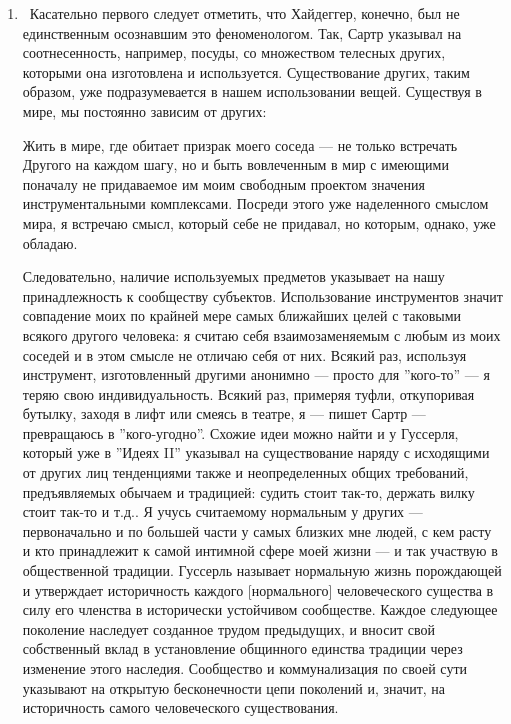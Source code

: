 \documentclass[11pt]{book}
\begin{document}
\begin{enumerate}
  \item\ Касательно первого следует отметить, что Хайдеггер, конечно, был не единственным осознавшим это феноменологом. Так, Сартр указывал на соотнесенность, например, посуды, со множеством телесных других, которыми она изготовлена и используется. Существование других, таким образом, уже подразумевается в нашем использовании вещей. Существуя в мире, мы постоянно зависим от других:

\smallskip
{}\relax
{}\relax

Жить в мире, где обитает призрак моего соседа --- не только встречать Другого на каждом шагу, но и быть вовлеченным в мир с имеющими поначалу не придаваемое им моим свободным проектом значения инструментальными комплексами. Посреди этого уже наделенного смыслом мира, я встречаю смысл, который себе не придавал, но которым, однако, уже обладаю.

\relax
{}\relax
\smallskip

Следовательно, наличие используемых предметов указывает на нашу принадлежность к сообществу субъектов. Использование инструментов значит совпадение моих по крайней мере самых ближайших целей с таковыми всякого другого человека: я считаю себя взаимозаменяемым с любым из моих соседей и в этом смысле не отличаю себя от них. Всякий раз, используя инструмент, изготовленный другими анонимно --- просто для ''кого-то'' --- я теряю свою индивидуальность. Всякий раз, примеряя туфли, откупоривая бутылку, заходя в лифт или смеясь в театре, я --- пишет Сартр --- превращаюсь в ''кого-угодно''. Схожие идеи можно найти и у Гуссерля, который уже в ''Идеях II'' указывал на существование наряду с исходящими от других лиц тенденциями также и неопределенных общих требований, предъявляемых обычаем и традицией: судить стоит так-то, держать вилку стоит так-то и т.д.. Я учусь считаемому нормальным у других --- первоначально и по большей части у самых близких мне людей, с кем расту и кто принадлежит к самой интимной сфере моей жизни --- и так участвую в общественной традиции. Гуссерль называет нормальную жизнь порождающей и утверждает историчность каждого [нормального] человеческого существа в силу его членства в исторически устойчивом сообществе. Каждое следующее поколение наследует созданное трудом предыдущих, и вносит свой собственный вклад в установление общинного единства традиции через изменение этого наследия. Сообщество и коммунализация по своей сути указывают на открытую бесконечности цепи поколений и, значит, на историчность самого человеческого существования.


\end{enumerate}
\end{document}
